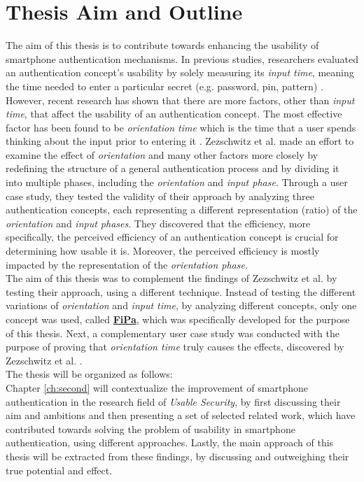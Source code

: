 \section{Thesis Aim and Outline}

The aim of this thesis is to contribute towards enhancing the usability of smartphone authentication mechanisms. In previous studies, researchers evaluated an authentication concept's usability by solely measuring its \textit{input time}, meaning the time needed to enter a particular secret (e.g. password, pin, pattern) \cite{Zezschwitz}.
However, recent research has shown that there are more factors, other than \textit{input time}, that affect the usability of an authentication concept. The most effective factor has been found to be \textit{orientation time} which is the time that a user spends thinking about the input prior to entering it \cite{Zezschwitz}. Zezschwitz et al. \cite{Zezschwitz} made an effort to examine the effect of \textit{orientation} and many other factors more closely by redefining the structure of a general authentication process and by dividing it into multiple phases, including the \textit{orientation} and \textit{input phase}. Through a user case study, they tested the validity of their approach by analyzing three authentication concepts, each representing a different representation (ratio) of the \textit{orientation} and \textit{input phases}. They discovered that the efficiency, more specifically, the perceived efficiency of an authentication concept is crucial for determining how usable it is. Moreover, the perceived efficiency is mostly impacted by the representation of the \textit{orientation phase}. \\

The aim of this thesis was to complement the findings of Zezschwitz et al. \cite{Zezschwitz} by testing their approach, using a different technique. Instead of testing the different variations of \textit{orientation} and \textit{input time}, by analyzing different concepts, only one concept was used, called \underline{\textbf{FiPa}}, which was specifically developed for the purpose of this thesis. Next, a complementary user case study was conducted with the purpose of proving that \textit{orientation time} truly causes the effects, discovered by Zezschwitz et al. \cite{Zezschwitz}.\\

The thesis will be organized as follows: \\

Chapter \ref{ch:second} will contextualize the improvement of smartphone authentication in the research field of \textit{Usable Security}, by first discussing their aim and ambitions and then presenting a set of selected related work, which have contributed towards solving the problem of usability in smartphone authentication, using different approaches. Lastly, the main approach of this thesis will be extracted from these findings, by discussing and outweighing their true potential and effect. \\

